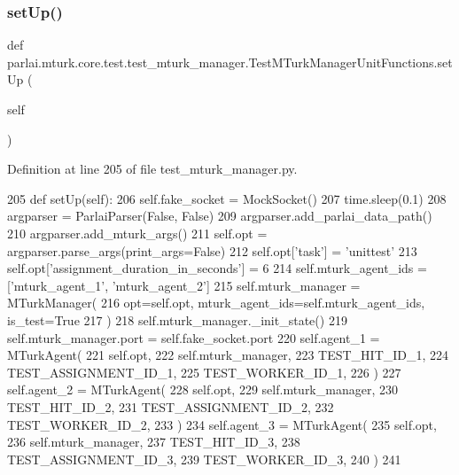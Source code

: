 \subsubsection{\texorpdfstring{set\+Up()}{setUp()}}
{\footnotesize\ttfamily def parlai.\+mturk.\+core.\+test.\+test\+\_\+mturk\+\_\+manager.\+Test\+M\+Turk\+Manager\+Unit\+Functions.\+set\+Up (\begin{DoxyParamCaption}\item[{}]{self }\end{DoxyParamCaption})}



Definition at line 205 of file test\+\_\+mturk\+\_\+manager.\+py.


\begin{DoxyCode}
205     \textcolor{keyword}{def }setUp(self):
206         self.fake\_socket = MockSocket()
207         time.sleep(0.1)
208         argparser = ParlaiParser(\textcolor{keyword}{False}, \textcolor{keyword}{False})
209         argparser.add\_parlai\_data\_path()
210         argparser.add\_mturk\_args()
211         self.opt = argparser.parse\_args(print\_args=\textcolor{keyword}{False})
212         self.opt[\textcolor{stringliteral}{'task'}] = \textcolor{stringliteral}{'unittest'}
213         self.opt[\textcolor{stringliteral}{'assignment\_duration\_in\_seconds'}] = 6
214         self.mturk\_agent\_ids = [\textcolor{stringliteral}{'mturk\_agent\_1'}, \textcolor{stringliteral}{'mturk\_agent\_2'}]
215         self.mturk\_manager = MTurkManager(
216             opt=self.opt, mturk\_agent\_ids=self.mturk\_agent\_ids, is\_test=\textcolor{keyword}{True}
217         )
218         self.mturk\_manager.\_init\_state()
219         self.mturk\_manager.port = self.fake\_socket.port
220         self.agent\_1 = MTurkAgent(
221             self.opt,
222             self.mturk\_manager,
223             TEST\_HIT\_ID\_1,
224             TEST\_ASSIGNMENT\_ID\_1,
225             TEST\_WORKER\_ID\_1,
226         )
227         self.agent\_2 = MTurkAgent(
228             self.opt,
229             self.mturk\_manager,
230             TEST\_HIT\_ID\_2,
231             TEST\_ASSIGNMENT\_ID\_2,
232             TEST\_WORKER\_ID\_2,
233         )
234         self.agent\_3 = MTurkAgent(
235             self.opt,
236             self.mturk\_manager,
237             TEST\_HIT\_ID\_3,
238             TEST\_ASSIGNMENT\_ID\_3,
239             TEST\_WORKER\_ID\_3,
240         )
241 
\end{DoxyCode}
\mbox{\label{classparlai_1_1mturk_1_1core_1_1test_1_1test__mturk__manager_1_1TestMTurkManagerUnitFunctions_a183e557fc6a0cc8e9942df9d9fb02445}} 
